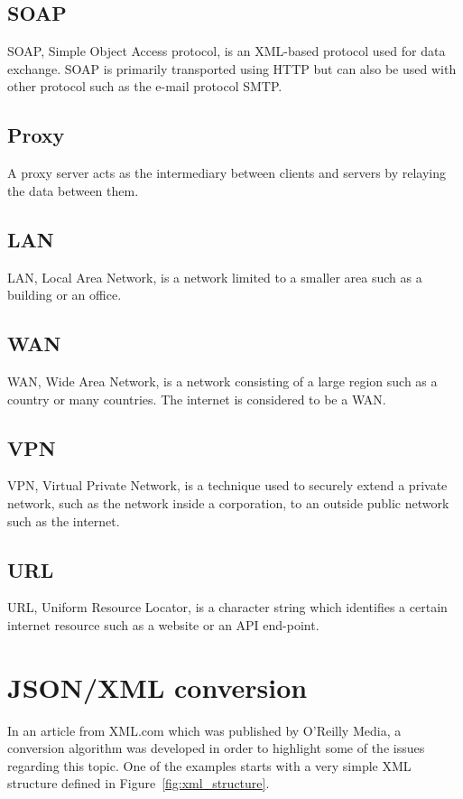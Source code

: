\documentclass{cslthse-msc}
\begin{document}
\begin{appendices}
\section{SOAP}
SOAP, Simple Object Access protocol, is an XML-based protocol used for data exchange. SOAP is primarily transported using HTTP but can also be used with other protocol such as the e-mail protocol SMTP.

\section{Proxy}
A proxy server acts as the intermediary between clients and servers by relaying the data between them.

\section{LAN}
LAN, Local Area Network, is a network limited to a smaller area such as a building or an office.

\section{WAN}
WAN, Wide Area Network, is a network consisting of a large region such as a country or many countries. The internet is considered to be a WAN.

\section{VPN}
VPN, Virtual Private Network, is a technique used to securely extend a private network, such as the network inside a corporation, to an outside public network such as the internet.

\section{URL}
URL, Uniform Resource Locator, is a character string which identifies a certain internet resource such as a website or an API end-point.

\chapter{JSON/XML conversion}

In an article from XML.com \cite{xml_json} which was published by O'Reilly Media, a conversion algorithm was developed in order to highlight some of the issues regarding this topic. One of the examples starts with a very simple XML structure defined in Figure~\ref{fig:xml_structure}.


\end{appendices}
\end{document}

